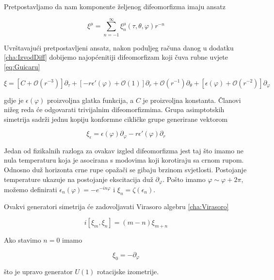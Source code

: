 \noindent Pretpostavljamo da nam komponente željenog difeomorfizma imaju ansatz

\begin{equation}
\xi^\mu=\sum\limits_{n=-1}^{\infty}\xi^\mu_n(\tau,\theta,\varphi)r^{-n}
\label{eq:ansatz}
\end{equation}

\noindent Uvrštavajući pretpostavljeni ansatz, nakon poduljeg računa danog u dodatku \ref{cha:IzvodDiff} dobijemo najopćenitiji difeomorfizam koji čuva rubne uvjete \eqref{eq:Guicaru}

\begin{equation}
\xi=[C+\mathcal{O}(r^{-3})]\partial_\tau+[-r\epsilon'(\varphi)+\mathcal{O}(1)]\partial_r+\mathcal{O}(r^{-1})\partial_\theta+[\epsilon(\varphi)+\mathcal{O}(r^{-2})]\partial_\varphi
\label{eq:diffeomorfizam}
\end{equation}

\noindent gdje je $\epsilon(\varphi)$ proizvoljna glatka funkcija, a $C$ je proizvoljna konstanta. Članovi nižeg reda će odgovarati trivijalnim difeomorfizmima. Grupa asimptotskih simetrija sadrži jednu kopiju konformne cikličke grupe generirane vektorom

\begin{equation}
\xi_\epsilon=\epsilon(\varphi)\partial_\varphi-r\epsilon'(\varphi)\partial_r
\label{eq:difeojedn}
\end{equation}

Jedan od fizikalnih razloga za ovakav izgled difeomorfizma jest taj što imamo ne nula temperaturu koja je asocirana s modovima koji korotiraju sa crnom rupom. Odnosno duž horizonta crne rupe opažači se gibaju brzinom svjetlosti. Postojanje temperature ukazuje na postojanje ekscitacija duž $\partial_\varphi$. Pošto imamo $\varphi\sim\varphi+2\pi$, možemo definirati $\epsilon_n(\varphi)=-e^{-in\varphi}$ i $\xi_n=\zeta(\epsilon_n)$.

\noindent Ovakvi generatori simetrija će zadovoljavati Virasoro algebru \ref{cha:Virasoro}

\begin{equation}
i[\xi_m,\xi_n]=(m-n)\xi_{m+n}
\end{equation}

\noindent Ako stavimo $n=0$ imamo 

\begin{equation}
\xi_0=-\partial_\varphi
\end{equation}

\noindent što je upravo generator $U(1)$ rotacijske izometrije.\medskip

